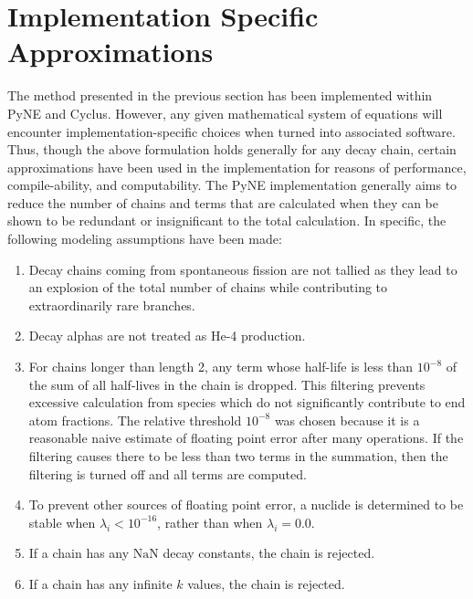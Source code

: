 \documentclass{anstrans}
\begin{document}
\section{Implementation Specific Approximations}
\label{approx}
The method presented in the previous section has been implemented within
PyNE and Cyclus. However, any given mathematical system of equations
will encounter implementation-specific choices when turned into 
associated software. Thus, though the above formulation holds generally for 
any decay chain, certain approximations have been used in the implementation
for reasons of performance, compile-ability, and computability.
The PyNE implementation generally aims to reduce the number of 
chains and terms that are calculated when they can be shown to be 
redundant or insignificant to the total calculation. In specific, the 
following modeling assumptions have been made:

\begin{enumerate}
\item Decay chains coming from spontaneous fission are not tallied as they 
    lead to an explosion of the total number of chains while contributing to 
    extraordinarily rare branches.
\item Decay alphas are not treated as He-4 production.
\item For chains longer than length 2, any 
    term whose half-life is less than $10^{-8}$ of the sum of all 
    half-lives in the chain is dropped. This filtering prevents excessive
    calculation from species which do not significantly contribute to 
    end atom fractions. The relative threshold $10^{-8}$ was chosen
    because it is a reasonable naive estimate of floating point error after 
    many operations. If the filtering causes there to be less than 
    two terms in the summation, then the filtering is turned off and all
    terms are computed.
\item To prevent other sources of floating point error, a nuclide is 
    determined to be stable when $\lambda_i < 10^{-16}$, rather than when 
    $\lambda_i = 0.0$.
\item If a chain has any $\mathrm{NaN}$ decay constants, the chain is rejected.
\item If a chain has any infinite $k$ values, the chain is rejected.
\end{enumerate}
\end{document}

